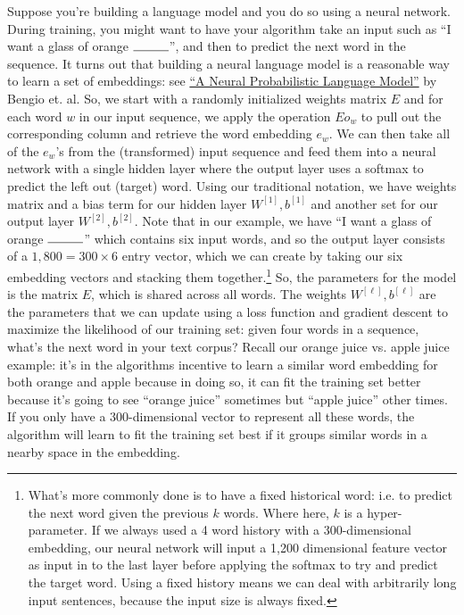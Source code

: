 \documentclass[12pt]{article}
\begin{document}
Suppose you're building a language model and you do so using a neural network. During training, you might want to have your algorithm take an input such as ``I want a glass of orange $\rule{1cm}{0.15mm}$'', and then to predict the next word in the sequence. It turns out that building a neural language model is a reasonable way to learn a set of embeddings: see \href{http://www.jmlr.org/papers/volume3/bengio03a/bengio03a.pdf}{``A Neural Probabilistic Language Model''} by Bengio et. al. So, we start with a randomly initialized weights matrix $E$ and for each word $w$ in our input sequence, we apply the operation $E o_w$ to pull out the corresponding column and retrieve the word embedding $e_w$. We can then take all of the $e_w$'s from the (transformed) input sequence and feed them into a neural network with a single hidden layer where the output layer uses a softmax to predict the left out (target) word. Using our traditional notation, we have weights matrix and a bias term for our hidden layer $W^{[1]}, b^{[1]}$ and another set for our output layer $W^{[2]}, b^{[2]}$. Note that in our example, we have ``I want a glass of orange $\rule{1cm}{0.15mm}$'' which contains six input words, and so the output layer consists of a $1,800 = 300 \times 6$ entry vector, which we can create by taking our six embedding vectors and stacking them together.\footnote{What's more commonly done is to have a fixed historical word: i.e. to predict the next word given the previous $k$ words. Where here, $k$ is a hyper-parameter. If we always used a 4 word history with a 300-dimensional embedding, our neural network will input a 1,200 dimensional feature vector as input in to the last layer before applying the softmax to try and predict the target word. Using a fixed history means we can deal with arbitrarily long input sentences, because the input size is always fixed.}
So, the parameters for the model is the matrix $E$, which is shared across all words. The weights $W^{[\ell]}, b^{[\ell]}$ are the parameters that we can update using a loss function and gradient descent to maximize the likelihood of our training set: given four words in a sequence, what's the next word in your text corpus? Recall our orange juice vs. apple juice example: it's in the algorithms incentive to learn a similar word embedding for both orange and apple because in doing so, it can fit the training set better because it's going to see ``orange juice'' sometimes but ``apple juice'' other times. If you only have a 300-dimensional vector to represent all these words, the algorithm will learn to fit the training set best if it groups similar words in a nearby space in the embedding.
\end{document}
